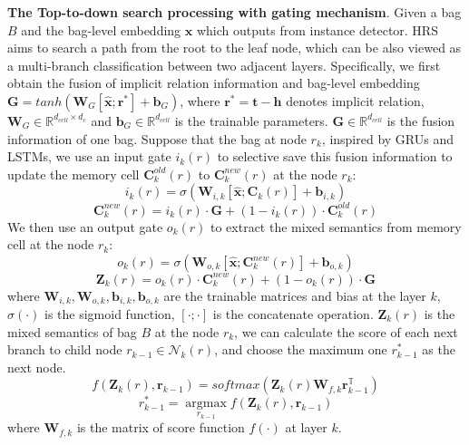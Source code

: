 \documentclass{article}
\begin{document}
\textbf{The Top-to-down search processing with gating mechanism}.
Given a bag $B$ and the bag-level embedding $\mathbf{\hat{x}}$ which outputs from instance detector. HRS aims to search a path from the root to the leaf node, which can be also viewed as a multi-branch classification between two adjacent layers. Specifically, we first obtain the fusion of implicit relation information and bag-level embedding $\mathbf{G} = tanh(\mathbf{W}_G[\mathbf{\hat{x}};\mathbf{r}^{*}] + \mathbf{b}_G)$, where $\mathbf{r}^{*}=\mathbf{t-h}$ denotes implicit relation, $\mathbf{W}_G\in\mathbb{R}^{d_{cell}\times d_c}$ and $\mathbf{b}_G\in\mathbb{R}^{d_{cell}}$ is the trainable parameters. $\mathbf{G}\in\mathbb{R}^{d_{cell}}$ is the fusion information of one bag. Suppose that the bag at node $r_k$, inspired by GRUs and LSTMs, we use an input gate $i_k(r)$ to selective save this fusion information to update the memory cell $\mathbf{C}_k^{old}(r)$ to $\mathbf{C}_k^{new}(r)$ at the node $r_k$:
\begin{equation}
i_k(r) = \sigma(\mathbf{W}_{i,k}[\mathbf{\hat{x}};\mathbf{C}_k(r)] + \mathbf{b}_{i,k})
\label{eq7}
\end{equation}
\begin{equation}
\mathbf{C}_k^{new}(r) = i_k(r)\cdot\mathbf{G} + (1 - i_k(r))\cdot\mathbf{C}_k^{old}(r)
\label{eq8}
\end{equation}
We then use an output gate $o_k(r)$ to extract the mixed semantics from memory cell at the node $r_k$:
\begin{equation}
o_k(r) = \sigma(\mathbf{W}_{o,k}[\mathbf{\hat{x}};\mathbf{C}_k^{new}(r)] + \mathbf{b}_{o,k})
\label{eq9}
\end{equation}
\begin{equation}
\mathbf{Z}_k(r) = o_k(r)\cdot\mathbf{C}_k^{new}(r) + (1 - o_k(r))\cdot\mathbf{G}
\label{eq10}
\end{equation}
where $\mathbf{W}_{i,k}, \mathbf{W}_{o,k}, \mathbf{b}_{i,k}, \mathbf{b}_{o,k}$ are the trainable matrices and bias at the layer $k$, $\sigma(\cdot)$ is the sigmoid function, $[\cdot ;\cdot]$ is the concatenate operation. $\mathbf{Z}_k(r)$ is the mixed semantics of bag $B$ at the node $r_k$, we can calculate the score of each next branch to child node $r_{k-1}\in\mathcal{N}_k(r)$, and choose the maximum one $r^{*}_{k-1}$ as the next node.
\begin{equation}
f(\mathbf{Z}_k(r), \mathbf{r}_{k-1}) = softmax(\mathbf{Z}_k(r)\mathbf{W}_{f,k}\mathbf{r}_{k-1}^{\mathbb{T}})
\label{eq11}
\end{equation}
\begin{equation}
r^{*}_{k-1} = \mathop{\arg\max}\limits_{r_{k-1}}f(\mathbf{Z}_k(r), \mathbf{r}_{k-1})
\label{eq12}
\end{equation}
where $\mathbf{W}_{f,k}$ is the matrix of score function $f(\cdot)$ at layer $k$.
\end{document}
